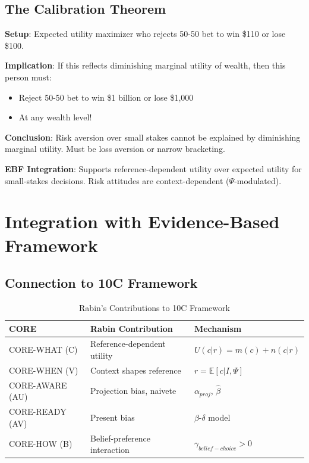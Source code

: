 \subsection{The Calibration Theorem}

\begin{tcolorbox}[colback=yellow!5!white,colframe=yellow!75!black,title=Worked Example: Rabin's Calibration Theorem (2000)]
\textbf{Setup}: Expected utility maximizer who rejects 50-50 bet to win \$110 or lose \$100.

\textbf{Implication}: If this reflects diminishing marginal utility of wealth, then this person must:
\begin{itemize}
    \item Reject 50-50 bet to win \$1 billion or lose \$1,000
    \item At any wealth level!
\end{itemize}

\textbf{Conclusion}: Risk aversion over small stakes cannot be explained by diminishing marginal utility. Must be loss aversion or narrow bracketing.

\textbf{EBF Integration}: Supports reference-dependent utility over expected utility for small-stakes decisions. Risk attitudes are context-dependent ($\Psi$-modulated).
\end{tcolorbox}

\section{Integration with Evidence-Based Framework}

\subsection{Connection to 10C Framework}

\begin{table}[h]
\centering
\caption{Rabin's Contributions to 10C Framework}
\label{tab:rabin-9c}
\begin{tabular}{lll}
\toprule
\textbf{CORE} & \textbf{Rabin Contribution} & \textbf{Mechanism} \\
\midrule
CORE-WHAT (C) & Reference-dependent utility & $U(c|r) = m(c) + n(c|r)$ \\
CORE-WHEN (V) & Context shapes reference & $r = \mathbb{E}[c|I, \Psi]$ \\
CORE-AWARE (AU) & Projection bias, naivete & $\alpha_{proj}$, $\hat{\beta}$ \\
CORE-READY (AV) & Present bias & $\beta$-$\delta$ model \\
CORE-HOW (B) & Belief-preference interaction & $\gamma_{belief-choice} > 0$ \\
\bottomrule
\end{tabular}
\end{table}

